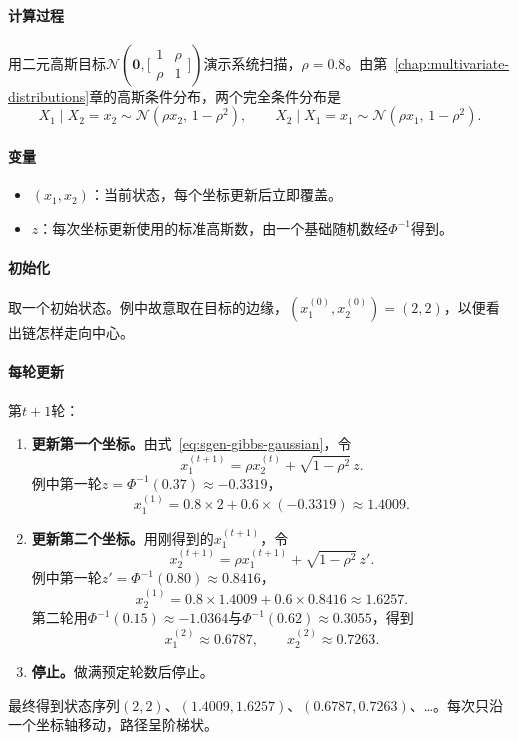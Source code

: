 \paragraph{计算过程}
用二元高斯目标$\mathcal{N}(\bm{0},\bigl[\begin{smallmatrix}1&\rho\\\rho&1\end{smallmatrix}\bigr])$演示系统扫描，$\rho=0.8$。由第~\ref{chap:multivariate-distributions}章的高斯条件分布，两个完全条件分布是
\begin{equation}
  X_1\mid X_2=x_2\sim\mathcal{N}(\rho x_2,\,1-\rho^{2}),\qquad X_2\mid X_1=x_1\sim\mathcal{N}(\rho x_1,\,1-\rho^{2}).
  \label{eq:sgen-gibbs-gaussian}
\end{equation}

\paragraph{变量}
\begin{itemize}
  \item $(x_1,x_2)$：当前状态，每个坐标更新后立即覆盖。
  \item $z$：每次坐标更新使用的标准高斯数，由一个基础随机数经$\Phi^{-1}$得到。
\end{itemize}

\paragraph{初始化}
取一个初始状态。例中故意取在目标的边缘，$(x_1^{(0)},x_2^{(0)})=(2,2)$，以便看出链怎样走向中心。

\paragraph{每轮更新}
第$t+1$轮：
\begin{enumerate}
  \item \textbf{更新第一个坐标。}由式~\eqref{eq:sgen-gibbs-gaussian}，令
  \[
    x_1^{(t+1)}=\rho x_2^{(t)}+\sqrt{1-\rho^{2}}\,z .
  \]
  例中第一轮$z=\Phi^{-1}(0.37)\approx-0.3319$，
  \[
    x_1^{(1)}=0.8\times2+0.6\times(-0.3319)\approx1.4009 .
  \]

  \item \textbf{更新第二个坐标。}用刚得到的$x_1^{(t+1)}$，令
  \[
    x_2^{(t+1)}=\rho x_1^{(t+1)}+\sqrt{1-\rho^{2}}\,z' .
  \]
  例中第一轮$z'=\Phi^{-1}(0.80)\approx0.8416$，
  \[
    x_2^{(1)}=0.8\times1.4009+0.6\times0.8416\approx1.6257 .
  \]
  第二轮用$\Phi^{-1}(0.15)\approx-1.0364$与$\Phi^{-1}(0.62)\approx0.3055$，得到
  \[
    x_1^{(2)}\approx0.6787,\qquad x_2^{(2)}\approx0.7263 .
  \]

  \item \textbf{停止。}做满预定轮数后停止。
\end{enumerate}
最终得到状态序列$(2,2)$、$(1.4009,1.6257)$、$(0.6787,0.7263)$、\dots。每次只沿一个坐标轴移动，路径呈阶梯状。

